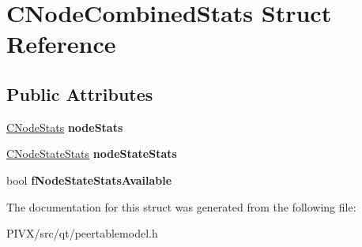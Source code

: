 \hypertarget{struct_c_node_combined_stats}{}\section{C\+Node\+Combined\+Stats Struct Reference}
\label{struct_c_node_combined_stats}
\subsection*{Public Attributes}
\begin{DoxyCompactItemize}
\item 
\mbox{\label{struct_c_node_combined_stats_ad26d590ef79b08623b2b6658b59e9a69}} 
\mbox{\hyperlink{class_c_node_stats}{C\+Node\+Stats}} {\bfseries node\+Stats}
\item 
\mbox{\label{struct_c_node_combined_stats_a6ce7320fa9ca5a3706ec4caf76ac34a1}} 
\mbox{\hyperlink{struct_c_node_state_stats}{C\+Node\+State\+Stats}} {\bfseries node\+State\+Stats}
\item 
\mbox{\label{struct_c_node_combined_stats_adc8bd9241fd1f220059b87398fa10fca}} 
bool {\bfseries f\+Node\+State\+Stats\+Available}
\end{DoxyCompactItemize}


The documentation for this struct was generated from the following file\+:\begin{DoxyCompactItemize}
\item 
P\+I\+V\+X/src/qt/peertablemodel.\+h\end{DoxyCompactItemize}
